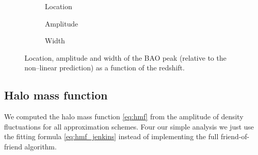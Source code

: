 \begin{figure}[tbp]
\newcommand{\corrwidth}{0.70}
\centering
	\begin{subfigure}{\corrwidth\textwidth}
	\end{subfigure}
	\begin{subfigure}{\corrwidth\textwidth}
		\centering
		\caption{Location}
	\end{subfigure}
	\begin{subfigure}{\corrwidth\textwidth}
		\centering
		\caption{Amplitude}
	\end{subfigure}
	\begin{subfigure}{\corrwidth\textwidth}
		\centering
		\caption{Width}
	\end{subfigure}
	\caption{Location, amplitude and width of the BAO peak (relative to the non--linear prediction) as a function of the redshift.}
	\label{fig:corr_peak}
\end{figure}

\subsection{Halo mass function}
We computed the halo mass function \eqref{eq:hmf} from the amplitude of density fluctuations for all approximation schemes. Four our simple analysis we just use the fitting formula \eqref{eq:hmf_jenkins} instead of implementing the full friend-of-friend algorithm.

